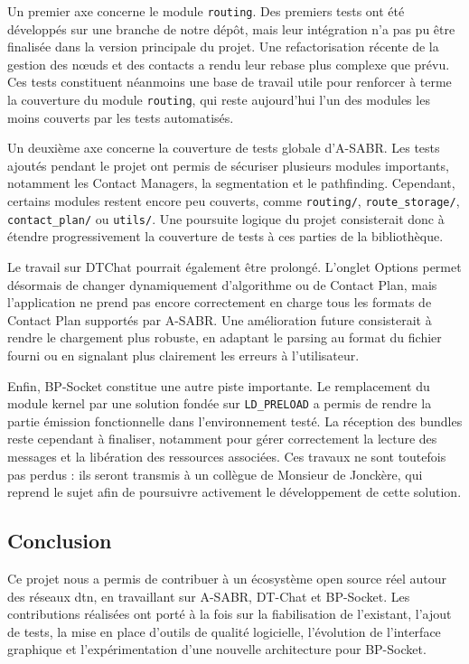\documentclass{article}
\begin{document}
Un premier axe concerne le module \texttt{routing}. Des premiers tests ont été développés sur une branche de notre dépôt, mais leur intégration n’a pas pu être finalisée dans la version principale du projet. Une refactorisation récente de la gestion des nœuds et des contacts a rendu leur rebase plus complexe que prévu. Ces tests constituent néanmoins une base de travail utile pour renforcer à terme la couverture du module \texttt{routing}, qui reste aujourd’hui l’un des modules les moins couverts par les tests automatisés.

Un deuxième axe concerne la couverture de tests globale d’A-SABR. Les tests ajoutés pendant le projet ont permis de sécuriser plusieurs modules importants, notamment les Contact Managers, la segmentation et le pathfinding. Cependant, certains modules restent encore peu couverts, comme \texttt{routing/}, \texttt{route\_storage/}, \texttt{contact\_plan/} ou \texttt{utils/}. Une poursuite logique du projet consisterait donc à étendre progressivement la couverture de tests à ces parties de la bibliothèque.

Le travail sur DTChat pourrait également être prolongé. L’onglet Options permet désormais de changer dynamiquement d’algorithme ou de Contact Plan, mais l’application ne prend pas encore correctement en charge tous les formats de Contact Plan supportés par A-SABR. Une amélioration future consisterait à rendre le chargement plus robuste, en adaptant le parsing au format du fichier fourni ou en signalant plus clairement les erreurs à l’utilisateur.

Enfin, BP-Socket constitue une autre piste importante. Le remplacement du module kernel par une solution fondée sur \texttt{LD\_PRELOAD} a permis de rendre la partie émission fonctionnelle dans l’environnement testé. La réception des bundles reste cependant à finaliser, notamment pour gérer correctement la lecture des messages et la libération des ressources associées. Ces travaux ne sont toutefois pas perdus : ils seront transmis à un collègue de Monsieur de Jonckère, qui reprend le sujet afin de poursuivre activement le développement de cette solution.
\subsection{Conclusion}

Ce projet nous a permis de contribuer à un écosystème open source réel autour des réseaux \gls{dtn}, en travaillant sur A-SABR, DT-Chat et BP-Socket. Les contributions réalisées ont porté à la fois sur la fiabilisation de l’existant, l’ajout de tests, la mise en place d’outils de qualité logicielle, l’évolution de l’interface graphique et l’expérimentation d’une nouvelle architecture pour BP-Socket.
\end{document}
